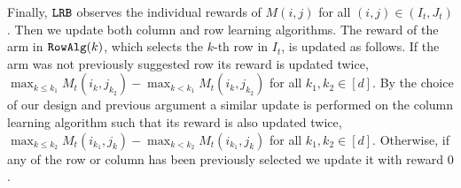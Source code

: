 Finally, ${\tt LRB}$ observes the individual rewards of $M(i,j)$ for all $(i,j)\in (I_t, J_t)$. Then we update both column and row learning algorithms. The reward of the arm in ${\tt RowAlg}(k)$, which selects the $k$-th row in $I_t$, is updated as follows. If the arm  was not previously suggested row its reward is updated twice, $\max_{k \leq k_1} M_t(i_k, j_{k_2}) - \max_{k < k_1} M_t(i_k, j_{k_2})$ for all $k_1,k_2 \in [d]$. By the choice of our design and previous argument a similar update is performed on the column learning algorithm such that its reward is also updated twice, $\max_{k \leq k_2} M_t(i_{k_1}, j_k)  - \max_{k < k_2} M_t(i_{k_1}, j_k)$ for all $k_1,k_2 \in [d]$. Otherwise, if any of the row or column has been previously selected we update it with reward $0$.





